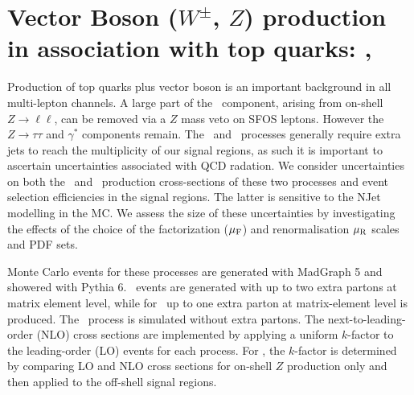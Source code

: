 \begin{table}
{
\label{table:background_summary}
}
\end{table} 


\section{Vector Boson ($W^{\pm}$, $Z$) production in association with top quarks: \ttV, \tZ}  
\label{section:ttV}
Production of top quarks plus vector boson is an important background in all multi-lepton channels.   A large part of the \ttV\ component, arising from on-shell $Z\to\ell\ell$, can be removed via a $Z$ mass veto on SFOS leptons.  However the $Z \to \tau\tau$ and $\gamma^*$ components remain. The \ttW\ and \tZ\ processes generally require extra jets to reach the multiplicity of our signal regions, as such it is important to ascertain uncertainties associated with QCD radation. We consider uncertainties on both the \ttW\ and \ttZ\ production cross-sections of these two processes and event selection efficiencies in the signal regions. The latter is sensitive to the NJet modelling in the MC. We assess the size of these uncertainties by investigating the effects of the choice of the factorization ($\mu_{\rm F}$) and renormalisation $\mu_{\rm R}$ scales and PDF sets. 

Monte Carlo events for these processes are generated with MadGraph 5 and showered with Pythia 6.  \ttW\ events are generated with up to two extra partons at matrix element level, while for \ttZ\ up to one extra parton at matrix-element level is produced.  The \tZ\ process is simulated without extra partons.  The next-to-leading-order (NLO) cross sections are implemented by applying a uniform $k$-factor to the leading-order (LO) events for each process.  For \ttZ, the $k$-factor is determined by comparing LO and NLO cross sections for on-shell $Z$ production only and then applied to the off-shell signal regions.  

